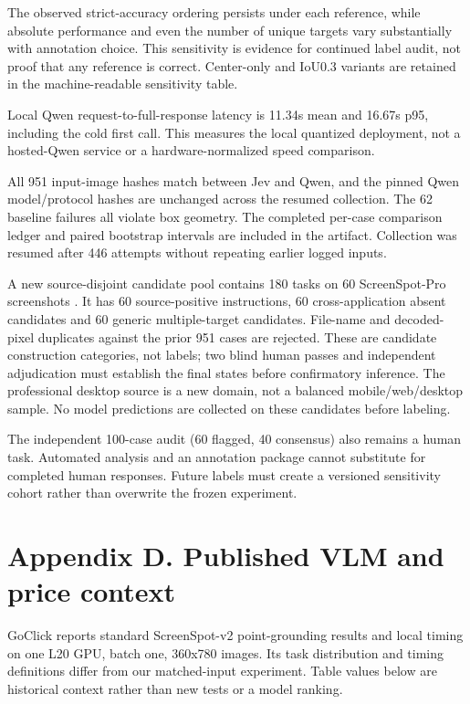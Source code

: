 \documentclass[10pt]{article}
\begin{document}
The observed strict-accuracy ordering persists under each reference, while absolute performance and even the number of unique targets vary substantially with annotation choice. This sensitivity is evidence for continued label audit, not proof that any reference is correct. Center-only and IoU0.3 variants are retained in the machine-readable sensitivity table.

Local Qwen request-to-full-response latency is 11.34s mean and 16.67s p95, including the cold first call. This measures the local quantized deployment, not a hosted-Qwen service or a hardware-normalized speed comparison.

All 951 input-image hashes match between Jev and Qwen, and the pinned Qwen model/protocol hashes are unchanged across the resumed collection. The 62 baseline failures all violate box geometry. The completed per-case comparison ledger and paired bootstrap intervals are included in the artifact. Collection was resumed after 446 attempts without repeating earlier logged inputs.

A new source-disjoint candidate pool contains 180 tasks on 60 ScreenSpot-Pro screenshots \citep{ref14}. It has 60 source-positive instructions, 60 cross-application absent candidates and 60 generic multiple-target candidates. File-name and decoded-pixel duplicates against the prior 951 cases are rejected. These are candidate construction categories, not labels; two blind human passes and independent adjudication must establish the final states before confirmatory inference. The professional desktop source is a new domain, not a balanced mobile/web/desktop sample. No model predictions are collected on these candidates before labeling.

The independent 100-case audit (60 flagged, 40 consensus) also remains a human task. Automated analysis and an annotation package cannot substitute for completed human responses. Future labels must create a versioned sensitivity cohort rather than overwrite the frozen experiment.

\section*{Appendix D. Published VLM and price context}
GoClick \citep[Table 3]{ref5} reports standard ScreenSpot-v2 point-grounding results and local timing on one L20 GPU, batch one, 360x780 images. Its task distribution and timing definitions differ from our matched-input experiment. Table values below are historical context rather than new tests or a model ranking.
\end{document}
